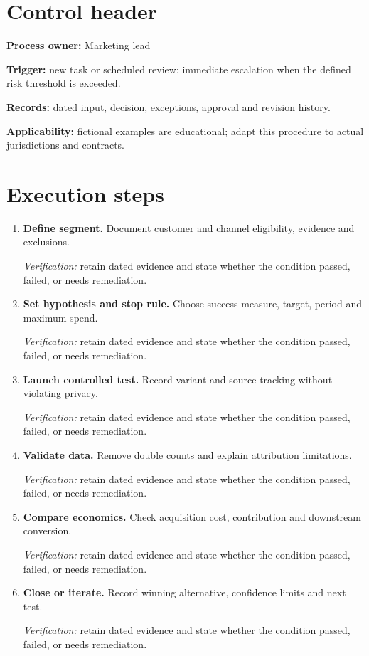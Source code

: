 \documentclass[11pt]{article}
\begin{document}
\SuiteOpen
\section{Control header}
\textbf{Process owner:} Marketing lead\par\textbf{Trigger:} new task or scheduled review; immediate escalation when the defined risk threshold is exceeded.\par\textbf{Records:} dated input, decision, exceptions, approval and revision history.\par\textbf{Applicability:} fictional examples are educational; adapt this procedure to actual jurisdictions and contracts.
\section{Execution steps}
\begin{enumerate}[leftmargin=*,itemsep=8pt]
\item \textbf{Define segment.} Document customer and channel eligibility, evidence and exclusions.\par\textit{Verification:} retain dated evidence and state whether the condition passed, failed, or needs remediation.
\item \textbf{Set hypothesis and stop rule.} Choose success measure, target, period and maximum spend.\par\textit{Verification:} retain dated evidence and state whether the condition passed, failed, or needs remediation.
\item \textbf{Launch controlled test.} Record variant and source tracking without violating privacy.\par\textit{Verification:} retain dated evidence and state whether the condition passed, failed, or needs remediation.
\item \textbf{Validate data.} Remove double counts and explain attribution limitations.\par\textit{Verification:} retain dated evidence and state whether the condition passed, failed, or needs remediation.
\item \textbf{Compare economics.} Check acquisition cost, contribution and downstream conversion.\par\textit{Verification:} retain dated evidence and state whether the condition passed, failed, or needs remediation.
\item \textbf{Close or iterate.} Record winning alternative, confidence limits and next test.\par\textit{Verification:} retain dated evidence and state whether the condition passed, failed, or needs remediation.
\end{enumerate}
\end{document}
